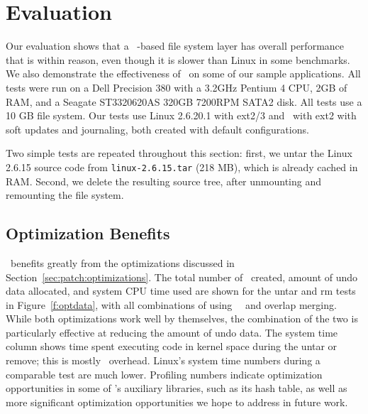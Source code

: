\section {Evaluation}
\label{sec:evaluation}

Our evaluation shows that a \Kudos\ \patch-based file system layer has
overall performance that is within reason, even though it is slower than
Linux in some benchmarks.  We also demonstrate the effectiveness of
\patchgroups\ on some of our sample applications. All tests were run on a
Dell Precision 380 with a 3.2GHz Pentium 4 CPU, 2GB of RAM, and a Seagate
ST3320620AS 320GB 7200RPM SATA2 disk.
%
All tests use a 10 GB file system.
%
Our tests use Linux 2.6.20.1 with ext2/3 and \Kudos\ with ext2 with
soft updates and journaling, both created with default configurations.

Two simple tests are repeated throughout this section: first, we untar
the Linux 2.6.15 source code from \texttt{linux-2.6.15.tar} (218 MB), which is
already cached in RAM. Second, we delete the resulting source
tree, after unmounting and remounting the file system.

\subsection {Optimization Benefits}

\Kudos\ benefits greatly from the optimizations discussed in
Section~\ref{sec:patch:optimizations}. The total number of \patches\ created,
amount of undo data allocated, and system CPU time used are shown for the
untar and rm tests in Figure~\ref{f:optdata}, with all combinations of using
\nrb\ \patches\ and overlap merging. While both optimizations work well by
themselves, the combination of the two is particularly effective at reducing the
amount of undo data.
%
The system time column shows time spent executing code in kernel space
during the untar or remove; this is mostly \Kudos\ overhead.  Linux's
system time numbers during a comparable test are much lower.  Profiling
numbers indicate optimization opportunities in some of \Kudos's auxiliary
libraries, such as its hash table, as well as more significant optimization
opportunities we hope to address in future work.


